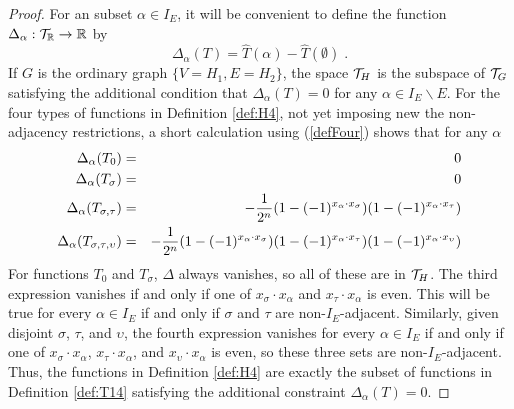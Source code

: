 \documentclass[12pt]{article}
\theoremstyle{definition}
\begin{document}
\begin{proof}
    For an subset $\alpha \in I_E$, it will be convenient to define the function $\Delta_\alpha : {\cal T}_\mathbb{R} \to \mathbb{R}$ by
    \[
    \Delta_\alpha(T) = \hat{T}(\alpha) - \hat{T}(\emptyset) \; .
    \]
    If $G$ is the ordinary graph $\{V = H_1, E = H_2\}$, the space ${\cal T}_H$ is the subspace of ${\cal T}_G$ satisfying the additional condition that $\Delta_\alpha(T) = 0$ for any $\alpha \in I_E \backslash E$. For the four types of functions in Definition \ref{def:H4}, not yet imposing new the non-adjacency restrictions, a short calculation using (\ref{defFour}) shows that for any $\alpha$
    \begin{eqnarray*}
       \Delta_\alpha(T_0) &=& 0 \cr
       \Delta_\alpha(T_\sigma) &=& 0 \cr
       \Delta_\alpha(T_{\sigma,\tau}) &=& -{1 \over 2^n}(1 - (-1)^{x_\alpha \cdot x_\sigma})(1 - (-1)^{x_\alpha \cdot x_\tau}) \cr
       \Delta_\alpha(T_{\sigma,\tau,\upsilon}) &=& -{1 \over 2^n}(1 - (-1)^{x_\alpha \cdot x_\sigma})(1 - (-1)^{x_\alpha \cdot x_\tau})(1 - (-1)^{x_\alpha \cdot x_\upsilon})  
    \end{eqnarray*}    
    For functions $T_0$ and $T_\sigma$, $\Delta$ always vanishes, so all of these are in ${\cal T}_H$. The third expression vanishes if and only if one of $x_\sigma \cdot x_\alpha$ and $x_\tau \cdot x_\alpha$ is even. This will be true for every $\alpha \in I_E$ if and only if $\sigma$ and $\tau$ are non-$I_E$-adjacent. Similarly, given disjoint $\sigma$, $\tau$, and $\upsilon$, the fourth expression vanishes for every $\alpha \in I_E$ if and only if one of $x_\sigma \cdot x_\alpha$, $x_\tau \cdot x_\alpha$, and $x_\upsilon \cdot x_\alpha$ is even, so these three sets are non-$I_E$-adjacent. Thus, the functions in Definition \ref{def:H4} are exactly the subset of functions in Definition \ref{def:T14} satisfying the additional constraint $\Delta_\alpha(T) = 0$. 
\end{proof}
\end{document}
